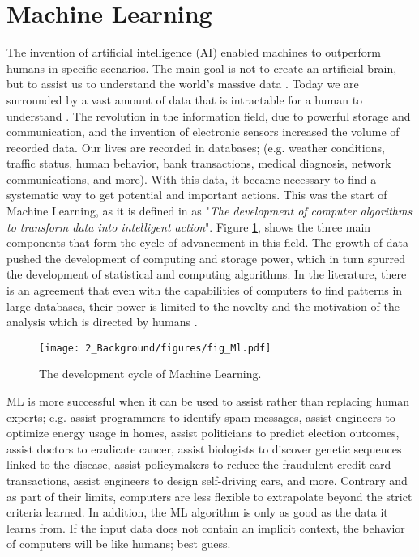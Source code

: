 \section{Machine Learning}
\label{sec:2_1_introd}
The invention of artificial intelligence (AI) enabled machines to outperform humans in specific scenarios. The main goal is not to create an artificial brain, but to assist us to understand the world's massive data \cite{lantz2013}. Today we are surrounded by a vast amount of data that is intractable for a human to understand \cite{garcia2015}. The revolution in the information field, due to powerful storage and communication, and the invention of electronic sensors increased the volume of recorded data. Our lives are recorded in databases; (e.g. weather conditions, traffic status, human behavior, bank transactions, medical diagnosis, network communications, and more). With this data, it became necessary to find a systematic way to get potential and important actions. This was the start of Machine Learning, as it is defined in \cite{lantz2013} as "\textit{The development of computer algorithms to transform data into intelligent action}". Figure \ref{ch2:ml}, shows the three main components that form the cycle of advancement in this field. The growth of data pushed the development of computing and storage power, which in turn spurred the development of statistical and computing algorithms. In the literature, there is an agreement that even with the capabilities of computers to find patterns in large databases, their power is limited to the novelty and the motivation of the analysis which is directed by humans \cite{lantz2013,han2011,nisbet2009}.               

\begin{figure}[!ht]
    \centering
    \texttt{[image: 2\_Background/figures/fig\_Ml.pdf]}
    \caption{The development cycle of Machine Learning.}
    \label{ch2:ml}
\end{figure}


 
 
 ML is more successful when it can be used to assist rather than replacing human experts; e.g. assist programmers to identify spam messages, assist engineers to optimize energy usage in homes, assist politicians to predict election outcomes, assist doctors to eradicate cancer, assist biologists to discover genetic sequences linked to the disease, assist policymakers to reduce the fraudulent credit card transactions, assist engineers to design self-driving cars, and more. Contrary and as part of their limits, computers are less flexible to extrapolate beyond the strict criteria learned. In addition, the ML algorithm is only as good as the data it learns from. If the input data does not contain an implicit context, the behavior of computers will be like humans; best guess.
 

